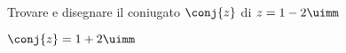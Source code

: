 	Trovare e disegnare il coniugato $\conj{z}$ di $z=1-2\uimm$
	
	$\conj{z}=1+2\uimm$
	\begin{center}
		
		\label{fig:disegnopianocomplesso05}
	\end{center}

